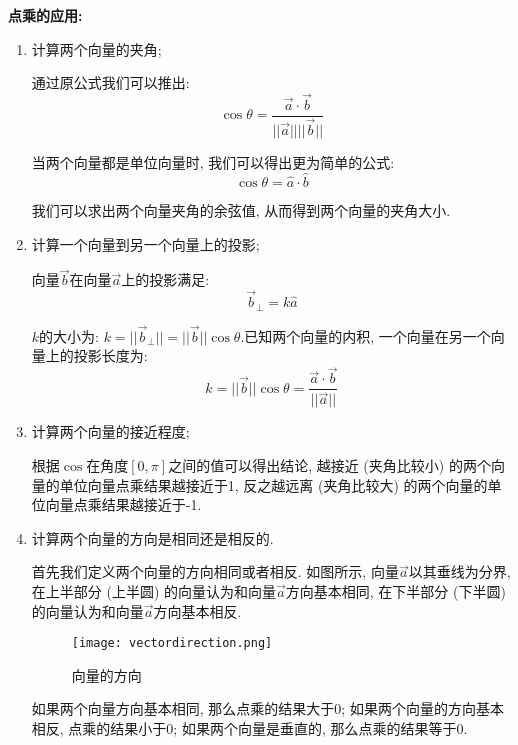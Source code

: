 \textbf{点乘的应用: }
\begin{enumerate}[label=1)]
	\item 计算两个向量的夹角; 
	
	通过原公式我们可以推出: 
	\begin{equation}
	\cos\theta=\frac{\overrightarrow{a}\cdot\overrightarrow{b}}{||\overrightarrow{a}||||\overrightarrow{b}||}
	\end{equation}

	当两个向量都是单位向量时, 我们可以得出更为简单的公式: 
	\begin{equation}
		\cos\theta=\hat{a}\cdot\hat{b}
	\end{equation}
	
	我们可以求出两个向量夹角的余弦值, 从而得到两个向量的夹角大小. 
	
	\item 计算一个向量到另一个向量上的投影; 
	
	向量$\overrightarrow{b}$在向量$\overrightarrow{a}$上的投影满足: 
	\begin{equation}
		\overrightarrow{b}_\perp=k\hat{a}
	\end{equation}

	$k$的大小为: $k = ||\overrightarrow{b}_\perp||=||\overrightarrow{b}||\cos\theta$.已知两个向量的内积, 一个向量在另一个向量上的投影长度为: 
	\begin{equation}
		k=||\overrightarrow{b}||\cos\theta=\frac{\overrightarrow{a}\cdot\overrightarrow{b}}{||\overrightarrow{a}||}
	\end{equation}

	\item 计算两个向量的接近程度; 
	
	根据$\cos$在角度$[0,\pi]$之间的值可以得出结论, 越接近 (夹角比较小) 的两个向量的单位向量点乘结果越接近于1, 反之越远离 (夹角比较大) 的两个向量的单位向量点乘结果越接近于-1.
	
	\item 计算两个向量的方向是相同还是相反的. 
	
	首先我们定义两个向量的方向相同或者相反. 如图所示, 向量$\overrightarrow{a}$以其垂线为分界, 在上半部分 (上半圆) 的向量认为和向量$\overrightarrow{a}$方向基本相同, 在下半部分 (下半圆) 的向量认为和向量$\overrightarrow{a}$方向基本相反. 
	\begin{figure}[H]
		\centering
		\texttt{[image: vectordirection.png]}
		\caption{向量的方向}
		\label{fig:vectordir}
	\end{figure}

	如果两个向量方向基本相同, 那么点乘的结果大于$0$; 如果两个向量的方向基本相反, 点乘的结果小于$0$; 如果两个向量是垂直的, 那么点乘的结果等于$0$.
	
	
\end{enumerate}

